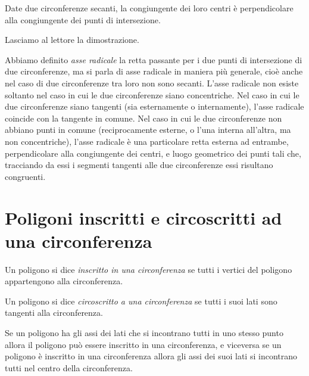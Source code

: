 \begin{corollario}
Date due circonferenze secanti, la congiungente dei loro centri è perpendicolare alla congiungente dei punti di intersezione.
\end{corollario}

Lasciamo al lettore la dimostrazione.

Abbiamo definito \emph{asse radicale} la retta passante per i due punti di intersezione di due circonferenze, ma si parla di asse radicale in maniera più generale, cioè anche nel caso di due circonferenze tra loro non sono secanti. L'asse radicale non esiste soltanto nel caso in cui le due circonferenze siano concentriche.
Nel caso in cui le due circonferenze siano tangenti (sia esternamente o internamente), l'asse radicale coincide con la tangente in comune.
Nel caso in cui le due circonferenze non abbiano punti in comune (reciprocamente esterne, o l'una interna all'altra, ma non concentriche), l'asse radicale è una particolare retta esterna ad entrambe, perpendicolare alla congiungente dei centri, e luogo geometrico dei punti tali che, tracciando da essi i segmenti tangenti alle due circonferenze essi risultano congruenti.


\section{Poligoni inscritti e circoscritti ad una circonferenza}

\begin{definizione}
Un poligono si dice \emph{inscritto in una circonferenza} se tutti i vertici del poligono appartengono alla circonferenza.
\end{definizione}

\begin{definizione}
Un poligono si dice \emph{circoscritto a una circonferenza} se tutti i suoi lati sono tangenti alla circonferenza.
\end{definizione}

\begin{teorema}
Se un poligono ha gli assi dei lati che si incontrano tutti in uno stesso punto allora il poligono può essere inscritto in una circonferenza, e viceversa se un poligono è inscritto in una circonferenza allora gli assi dei suoi lati si incontrano tutti nel centro della circonferenza.
\end{teorema}

